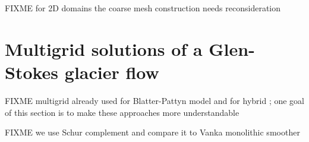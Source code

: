 \documentclass[letterpaper,final,12pt,reqno]{amsart}
\begin{document}
FIXME for 2D domains the coarse mesh construction needs reconsideration

\section{Multigrid solutions of a Glen-Stokes glacier flow} \label{sec:stokes}

FIXME multigrid already used for Blatter-Pattyn model \cite{BrownSmithAhmadia2013} and for hybrid \cite{Jouvetetal2013}; one goal of this section is to make these approaches more understandable

FIXME we use Schur complement \cite{Bueler2021,Elmanetal2014} and compare it to Vanka monolithic smoother \cite{Farrelletal2019}

\small

\bigskip


\end{document}
